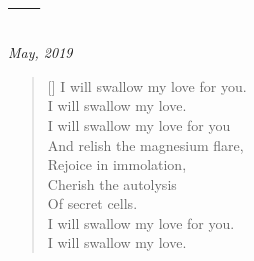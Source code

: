 \section{---}

\hfill\textit{May, 2019}

\begin{verse}[\textwidth]
    I will swallow my love for you.\\
    I will swallow my love.\\
    I will swallow my love for you\\
    And relish the magnesium flare,\\
    Rejoice in immolation,\\
    Cherish the autolysis\\
    Of secret cells.\\
    I will swallow my love for you.\\
    I will swallow my love.
\end{verse}
\newpage
